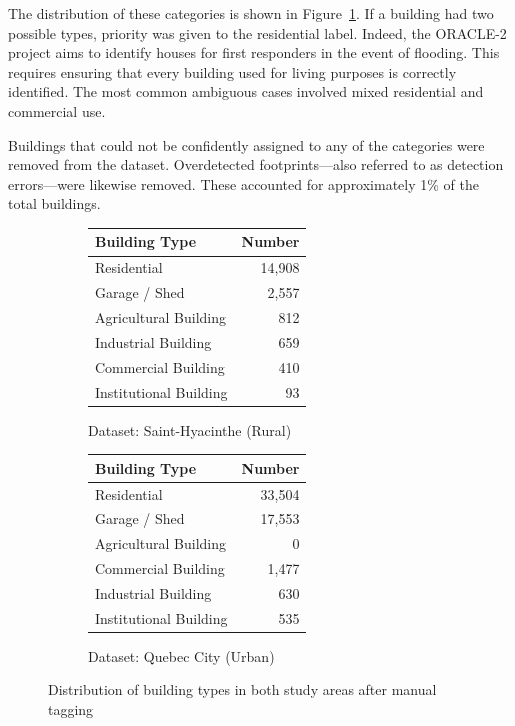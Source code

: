 \documentclass[11pt]{article}
\begin{document}
The distribution of these categories is shown in Figure~\ref{fig:building-distribution}. If a building had two possible types, priority was given to the residential label. Indeed, the ORACLE-2 project aims to identify houses for first responders in the event of flooding.  
This requires ensuring that every building used for living purposes is correctly identified. The most common ambiguous cases involved mixed residential and commercial use.

Buildings that could not be confidently assigned to any of the categories were removed from the dataset. Overdetected footprints—also referred to as detection errors—were likewise removed. These accounted for approximately 1\% of the total buildings.



\begin{figure}[H]
\centering
\begin{subfigure}{0.48\textwidth}
\centering
\caption*{Dataset: Saint-Hyacinthe (Rural)}
\begin{tabular}{lr}
\toprule
Building Type & Number \\
\midrule
Residential & 14,908 \\
Garage / Shed & 2,557 \\
Agricultural Building & 812 \\
Industrial Building & 659 \\
Commercial Building & 410 \\
Institutional Building & 93 \\
\bottomrule
\end{tabular}
\end{subfigure}%
\hfill
\begin{subfigure}{0.48\textwidth}
\centering
\caption*{Dataset: Quebec City (Urban)}
\begin{tabular}{lr}
\toprule
Building Type & Number \\
\midrule
Residential & 33,504 \\
Garage / Shed & 17,553 \\
Agricultural Building & 0 \\
Commercial Building & 1,477 \\
Industrial Building & 630 \\
Institutional Building & 535 \\
\bottomrule
\end{tabular}
\end{subfigure}
\caption{Distribution of building types in both study areas after manual tagging}
\label{fig:building-distribution}
\end{figure}
\end{document}
